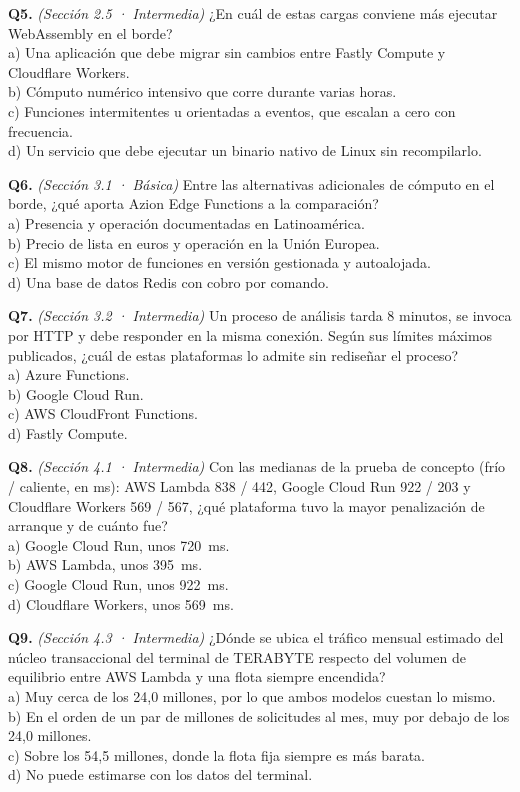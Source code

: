 \documentclass[12pt, letterpaper, table, xcdraw]{inf-pucv}
\begin{document}
\textbf{Q5.} \textit{(Sección 2.5 · Intermedia)} ¿En cuál de estas cargas conviene más ejecutar WebAssembly en el borde? \\
a) Una aplicación que debe migrar sin cambios entre Fastly Compute y Cloudflare Workers. \\
b) Cómputo numérico intensivo que corre durante varias horas. \\
c) Funciones intermitentes u orientadas a eventos, que escalan a cero con frecuencia. \\
d) Un servicio que debe ejecutar un binario nativo de Linux sin recompilarlo.

\textbf{Q6.} \textit{(Sección 3.1 · Básica)} Entre las alternativas adicionales de cómputo en el borde, ¿qué aporta Azion Edge Functions a la comparación? \\
a) Presencia y operación documentadas en Latinoamérica. \\
b) Precio de lista en euros y operación en la Unión Europea. \\
c) El mismo motor de funciones en versión gestionada y autoalojada. \\
d) Una base de datos Redis con cobro por comando.

\textbf{Q7.} \textit{(Sección 3.2 · Intermedia)} Un proceso de análisis tarda 8 minutos, se invoca por HTTP y debe responder en la misma conexión. Según sus límites máximos publicados, ¿cuál de estas plataformas lo admite sin rediseñar el proceso? \\
a) Azure Functions. \\
b) Google Cloud Run. \\
c) AWS CloudFront Functions. \\
d) Fastly Compute.

\textbf{Q8.} \textit{(Sección 4.1 · Intermedia)} Con las medianas de la prueba de concepto (frío / caliente, en ms): AWS Lambda 838 / 442, Google Cloud Run 922 / 203 y Cloudflare Workers 569 / 567, ¿qué plataforma tuvo la mayor penalización de arranque y de cuánto fue? \\
a) Google Cloud Run, unos 720~ms. \\
b) AWS Lambda, unos 395~ms. \\
c) Google Cloud Run, unos 922~ms. \\
d) Cloudflare Workers, unos 569~ms.

\textbf{Q9.} \textit{(Sección 4.3 · Intermedia)} ¿Dónde se ubica el tráfico mensual estimado del núcleo transaccional del terminal de TERABYTE respecto del volumen de equilibrio entre AWS Lambda y una flota siempre encendida? \\
a) Muy cerca de los 24,0 millones, por lo que ambos modelos cuestan lo mismo. \\
b) En el orden de un par de millones de solicitudes al mes, muy por debajo de los 24,0 millones. \\
c) Sobre los 54,5 millones, donde la flota fija siempre es más barata. \\
d) No puede estimarse con los datos del terminal.
\end{document}
